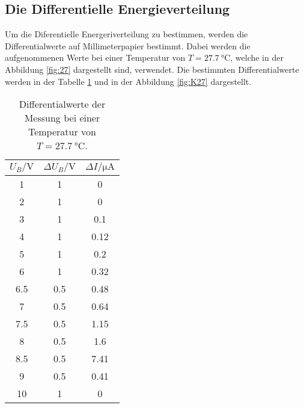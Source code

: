 \subsection{Die Differentielle Energieverteilung}
Um die Diferentielle Energeriverteilung zu bestimmen, werden die Differentialwerte auf Millimeterpapier bestimmt.
Dabei werden die aufgenommenen Werte bei einer Temperatur von $T = \qty{27.7}{\degreeCelsius}$, welche in der Abbildung \ref{fig:27} dargestellt sind, verwendet.
Die bestimmten Differentialwerte werden in der Tabelle \ref{tab:27} und in der Abbildung \ref{fig:K27} dargestellt.
\begin{table}[H]
    \centering
    \caption{Differentialwerte der Messung bei einer Temperatur von $T = \qty{27.7}{\degreeCelsius}$.}
    \label{tab:27}
    \begin{tabular}{c c c}
        \toprule
        $U_B / \unit{\volt}$ & $\Delta U_B/\unit{\volt}$ & $\Delta I/\unit{\micro\ampere}$  \\
        \midrule
        1   & 1   &  0\\
        2   & 1   &  0\\
        3   & 1   &  0.1\\
        4   & 1   &  0.12\\
        5   & 1   &  0.2\\
        6   & 1   &  0.32\\
        6.5 & 0.5 &  0.48\\
        7   & 0.5 &  0.64\\
        7.5 & 0.5 &  1.15\\
        8   & 0.5 &  1.6\\
        8.5 & 0.5 &  7.41\\
        9   & 0.5 &  0.41\\
        10  & 1   &  0 \\
        \bottomrule
    \end{tabular}
\end{table}

